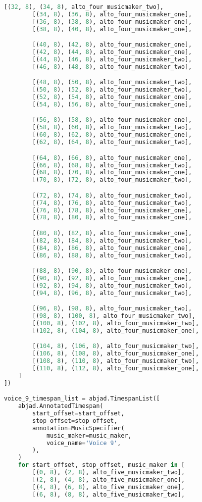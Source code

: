 \begin{lstlisting}[language=Python, caption=Invocation Source Code]
        [(32, 8), (34, 8), alto_four_musicmaker_two],
        [(34, 8), (36, 8), alto_four_musicmaker_one],
        [(36, 8), (38, 8), alto_four_musicmaker_one],
        [(38, 8), (40, 8), alto_four_musicmaker_one],

        [(40, 8), (42, 8), alto_four_musicmaker_one],
        [(42, 8), (44, 8), alto_four_musicmaker_one],
        [(44, 8), (46, 8), alto_four_musicmaker_two],
        [(46, 8), (48, 8), alto_four_musicmaker_two],

        [(48, 8), (50, 8), alto_four_musicmaker_two],
        [(50, 8), (52, 8), alto_four_musicmaker_two],
        [(52, 8), (54, 8), alto_four_musicmaker_one],
        [(54, 8), (56, 8), alto_four_musicmaker_one],

        [(56, 8), (58, 8), alto_four_musicmaker_one],
        [(58, 8), (60, 8), alto_four_musicmaker_two],
        [(60, 8), (62, 8), alto_four_musicmaker_one],
        [(62, 8), (64, 8), alto_four_musicmaker_two],

        [(64, 8), (66, 8), alto_four_musicmaker_one],
        [(66, 8), (68, 8), alto_four_musicmaker_two],
        [(68, 8), (70, 8), alto_four_musicmaker_one],
        [(70, 8), (72, 8), alto_four_musicmaker_two],

        [(72, 8), (74, 8), alto_four_musicmaker_two],
        [(74, 8), (76, 8), alto_four_musicmaker_two],
        [(76, 8), (78, 8), alto_four_musicmaker_one],
        [(78, 8), (80, 8), alto_four_musicmaker_one],

        [(80, 8), (82, 8), alto_four_musicmaker_one],
        [(82, 8), (84, 8), alto_four_musicmaker_two],
        [(84, 8), (86, 8), alto_four_musicmaker_one],
        [(86, 8), (88, 8), alto_four_musicmaker_two],

        [(88, 8), (90, 8), alto_four_musicmaker_one],
        [(90, 8), (92, 8), alto_four_musicmaker_one],
        [(92, 8), (94, 8), alto_four_musicmaker_two],
        [(94, 8), (96, 8), alto_four_musicmaker_two],

        [(96, 8), (98, 8), alto_four_musicmaker_two],
        [(98, 8), (100, 8), alto_four_musicmaker_two],
        [(100, 8), (102, 8), alto_four_musicmaker_two],
        [(102, 8), (104, 8), alto_four_musicmaker_one],

        [(104, 8), (106, 8), alto_four_musicmaker_two],
        [(106, 8), (108, 8), alto_four_musicmaker_one],
        [(108, 8), (110, 8), alto_four_musicmaker_two],
        [(110, 8), (112, 8), alto_four_musicmaker_one],
    ]
])

voice_9_timespan_list = abjad.TimespanList([
    abjad.AnnotatedTimespan(
        start_offset=start_offset,
        stop_offset=stop_offset,
        annotation=MusicSpecifier(
            music_maker=music_maker,
            voice_name='Voice 9',
        ),
    )
    for start_offset, stop_offset, music_maker in [
        [(0, 8), (2, 8), alto_five_musicmaker_two],
        [(2, 8), (4, 8), alto_five_musicmaker_one],
        [(4, 8), (6, 8), alto_five_musicmaker_one],
        [(6, 8), (8, 8), alto_five_musicmaker_two],


\end{lstlisting}
